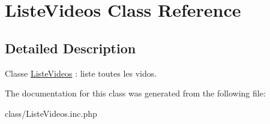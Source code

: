 \hypertarget{class_liste_videos}{
\section{ListeVideos Class Reference}
\label{class_liste_videos}
}


\subsection{Detailed Description}
Classe \hyperlink{class_liste_videos}{ListeVideos} : liste toutes les vidos. 

The documentation for this class was generated from the following file:\begin{DoxyCompactItemize}
\item 
class/ListeVideos.inc.php\end{DoxyCompactItemize}
